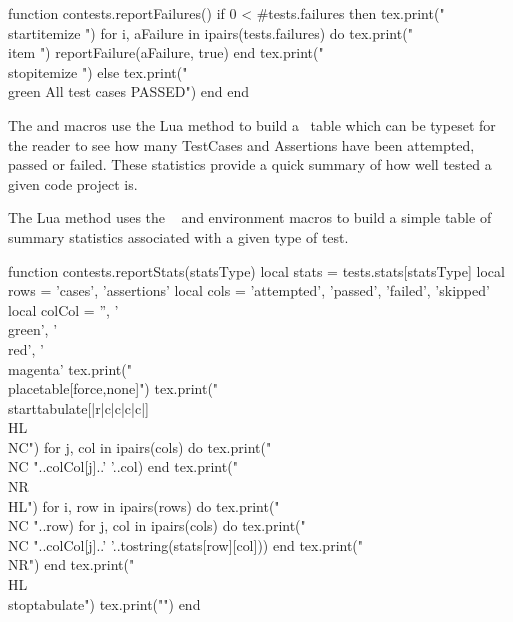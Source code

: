 \startMkIVCode
\def\reportFailures{
  \directlua{thirddata.contests.reportFailures()}
}
\stopMkIVCode

\startLuaCode
function contests.reportFailures()
  if 0 < #tests.failures then
    tex.print("\\startitemize ")
    for i, aFailure in ipairs(tests.failures) do
      tex.print("\\item ")
      reportFailure(aFailure, true)
    end
    tex.print("\\stopitemize ")
  else
    tex.print("{\\green All test cases PASSED}")
  end
end
\stopLuaCode

The \type{\reportMkIVStats} and \type{\reportLuaStats} macros use the 
 Lua method to build a \ConTeXt\ table which can be 
typeset for the reader to see how many TestCases and Assertions have been 
attempted, passed or failed. These statistics provide a quick summary of 
how well tested a given code project is. 

\startMkIVCode
\def\reportMkIVStats{
  \directlua{thirddata.contests.reportStats('mkiv')}
}

\def\reportLuaStats{
  \directlua{thirddata.contests.reportStats('lua')}
}
\stopMkIVCode

The  Lua method uses the \ConTeXt\ \type{\placetable} 
and  environment macros to build a simple table of summary 
statistics associated with a given type of test. 

\startLuaCode
function contests.reportStats(statsType)
  local stats = tests.stats[statsType]
  local rows = { 'cases', 'assertions' }
  local cols =
    { 'attempted', 'passed', 'failed', 'skipped' }
  local colCol = { '', '\\green', '\\red', '\\magenta' }
  tex.print("\\placetable[force,none]{}{")
  tex.print("\\starttabulate[|r|c|c|c|c|]\\HL\\NC")
  for j, col in ipairs(cols) do
    tex.print("\\NC "..colCol[j]..' '..col)
  end
  tex.print("\\NR\\HL")
  for i, row in ipairs(rows) do
    tex.print("\\NC "..row)
    for j, col in ipairs(cols) do
      tex.print("\\NC "..colCol[j]..' '..tostring(stats[row][col]))
    end
    tex.print("\\NR")
  end
  tex.print("\\HL\\stoptabulate")
  tex.print("}")
end
\stopLuaCode

\stopchapter
